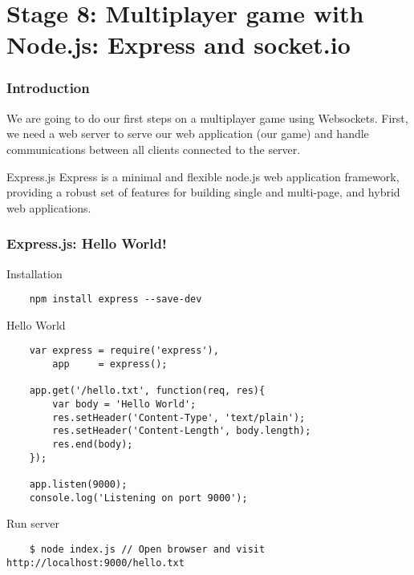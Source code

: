\section{Stage 8: Multiplayer game with Node.js: Express and socket.io}

\begin{frame}[fragile]
  \frametitle{Introduction}

  We are going to do our first steps on a multiplayer game using Websockets. First, we need a web server to serve our web application (our game) and handle communications between all clients connected to the server.

  \pause

  \begin{block}{Express.js}
    Express is a minimal and flexible node.js web application framework, providing a robust set of features for building single and multi-page, and hybrid web applications.
  \end{block}
\end{frame}
    
\begin{frame}[fragile]
  \frametitle{Express.js: Hello World!}

  \begin{block}{Installation}
    {\tiny
    \begin{verbatim}
    npm install express --save-dev
    \end{verbatim}
    }
  \end{block}

  \pause

  \begin{block}{Hello World}
    {\tiny
    \begin{verbatim}
    var express = require('express'),
        app     = express();

    app.get('/hello.txt', function(req, res){
        var body = 'Hello World';
        res.setHeader('Content-Type', 'text/plain');
        res.setHeader('Content-Length', body.length);
        res.end(body);
    });

    app.listen(9000);
    console.log('Listening on port 9000');
    \end{verbatim}
    }
  \end{block}

  \pause

  \begin{block}{Run server}
    {\tiny
    \begin{verbatim}
    $ node index.js // Open browser and visit http://localhost:9000/hello.txt
    \end{verbatim}
    }
  \end{block}
\end{frame}

